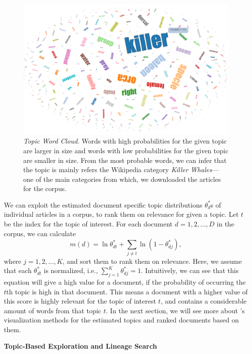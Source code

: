 \begin{figure}[htb]\centering 
\includegraphics[width=.9\textwidth]{images/topic_visualization.png}
\caption{\textsl{Topic Word Cloud}. Words with high probabilities for the 
given topic are larger in size and words with low probabilities for 
the given topic are smaller in size. From the most probable words, 
we can infer that the topic is mainly refers the Wikipedia category 
\textit{Killer Whales}---one of the main categories from which, we 
downloaded the articles for the corpus.}
\label{fig:topic-word-cloud}
\end{figure}

We can exploit the estimated document specific topic distributions 
$\theta_d^{*}$s of individual articles in a corpus, to rank them on 
relevance for given a topic. Let $t$ be the index for the topic of 
interest. For each document $d = 1, 2, \ldots, D$ in the corpus, we 
can calculate~\cite{George2012}
\begin{equation}
m(d) = \ln \theta^*_{dt} + \sum_{j \neq t}{\ln (1 - \theta^*_{dj})},
\end{equation} 
where $j = 1, 2, \ldots, K$, and sort them to rank them on relevance. 
Here, we assume that each $\theta^*_{dt}$ is normalized, i.e., 
$\sum_{j=1}^{K}{\theta^*_{dj}} = 1$. Intuitively, we can see that 
this equation will give a high value for a document, if the 
probability of occurring the $t$th topic is high in that document. 
This means a document with a higher value of this score is highly 
relevant for the topic of interest $t$, and contains a considerable 
amount of words from that topic $t$. In the next section, we will 
see more about \system's visualization methods for the estimated 
topics and ranked documents based on them.      


\noindent\textbf{Topic-Based Exploration and Lineage Search}

